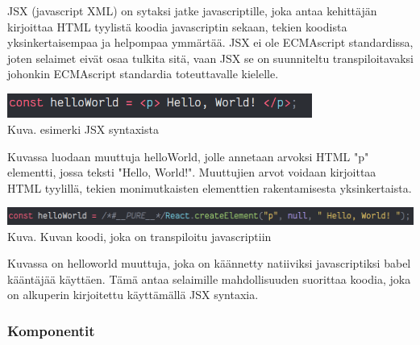

JSX (javascript XML) on sytaksi jatke javascriptille, joka antaa kehittäjän kirjoittaa HTML tyylistä koodia javascriptin sekaan, tekien koodista yksinkertaisempaa ja helpompaa ymmärtää. 
JSX ei ole ECMAscript standardissa, joten selaimet eivät osaa tulkita sitä, vaan JSX se on suunniteltu transpiloitavaksi johonkin ECMAscript standardia toteuttavalle kielelle.
\medskip

\bigskip
\includegraphics[width=10cm]{src/public/oppar/pure_jsx_example.png}\\
Kuva\getImgCount .{} esimerki JSX syntaxista
\medskip

Kuvassa luodaan muuttuja helloWorld, jolle annetaan arvoksi HTML "p"{} elementti, jossa teksti "Hello, World!"{}.
Muuttujien arvot voidaan kirjoittaa HTML tyylillä, tekien monimutkaisten elementtien rakentamisesta yksinkertaista.
\medskip



\bigskip
\includegraphics[width=15cm]{src/public/oppar/transpiled_jsx_example.png}\\
Kuva\getImgCount .{} Kuvan \prevImageCount{} koodi, joka on transpiloitu javascriptiin
\medskip


Kuvassa on helloworld muuttuja, joka on käännetty natiiviksi javascriptiksi babel kääntäjää käyttäen. 
Tämä antaa selaimille mahdollisuuden suorittaa koodia, joka on alkuperin kirjoitettu käyttämällä JSX syntaxia.
\medskip



\subsubsection{Komponentit}




